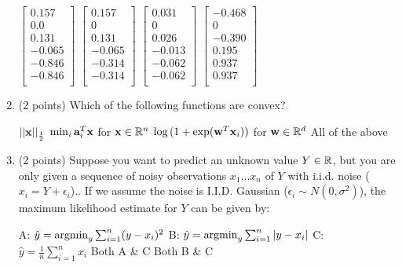 \begin{enumerate}[start]
\begin{oneparcheckboxes}
	\choice 
	$\begin{bmatrix}
		0.157 \\
		0.0 \\
		0.131 \\
		-0.065 \\
		-0.846 \\
		-0.846 \\
	\end{bmatrix}$
 \choice $\begin{bmatrix}
	0.157 \\
	0 \\
	0.131 \\
	-0.065 \\
	-0.314 \\
	-0.314 \\
	\end{bmatrix}$
	\choice $\begin{bmatrix}
	0.031 \\
	0 \\
	0.026 \\
	-0.013 \\
	-0.062 \\
	-0.062 \\
	\end{bmatrix}$
	\choice $\begin{bmatrix}
	-0.468 \\
	0 \\
	-0.390 \\
	0.195 \\
	0.937 \\
	0.937 \\
	\end{bmatrix}$
\end{oneparcheckboxes}

\item (2 points) Which of the following functions are convex?
\begin{checkboxes}
\choice $ || \mathbf{x} ||_{\frac{1}{2}}$ 
\choice $\min_{i} \textbf{a}_{i}^T \mathbf{x}$ for $\mathbf{x} \in \mathbb{R}^n$ 
\choice $\log{(1+\exp(\mathbf{w}^T \mathbf{x}_i))} $ for $\mathbf{w} \in \mathbb{R}^d$
\choice All of the above
\end{checkboxes}


\item (2 points) Suppose you want to predict an unknown value $Y \in \mathbb{R}$, but you are only given
a sequence of noisy observations $x_1 ... x_n$ of $Y$ with i.i.d. noise ($x_i = Y + \epsilon_i $).. If we assume the noise is I.I.D. 
Gaussian ($\epsilon_i \sim N(0, \sigma^2)$), the maximum likelihood 
estimate for $Y$ can be given by: 


\begin{checkboxes}
	\choice A: $ \hat y = \mathop{\mathrm{argmin}}_y \sum_{i=1}^{n} (y - x_i)^2 $ 
	\choice B: $ \hat y = \mathop{\mathrm{argmin}}_y \sum_{i=1}^{n} |y - x_i| $
	\choice C: $\hat y = \frac{1}{n} \sum_{i=1}^{n} x_i $
	\choice Both A \&  C
	\choice Both B \& C
	
\end{checkboxes}
\end{enumerate}
\pagebreak
